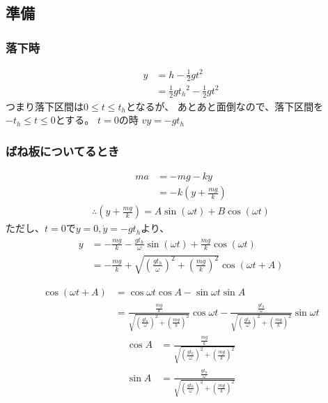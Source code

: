\documentclass[a4paper,11pt]{jsarticle}
\begin{document}
\subsection{準備}
\subsubsection{落下時}

\begin{align}
  y
   & = h - \frac{1}{2}gt^2
  \\ &= \frac{1}{2}g{t_h}^2 - \frac{1}{2}gt^2
\end{align}
つまり落下区間は$0\leq t \leq t_h$となるが、
あとあと面倒なので、落下区間を$-t_h\leq t \leq 0$とする。
$t = 0$の時
$vy = -gt_h$

\subsubsection{ばね板についてるとき}
\begin{align}
  ma & = -mg - ky
  \\ &= -k\left(y + \frac{mg}{k}\right)
\end{align}
\begin{align}
  \therefore
  \left(y+\frac{mg}{k}\right) = A\sin(\omega t) + B\cos(\omega t)
\end{align}
ただし、$t=0$で$y=0,\dot{y}=-gt_h$より、
\begin{align}
  y & = -\frac{mg}{k} - \frac{gt_h}{\omega}\sin(\omega t) + \frac{mg}{k}\cos(\omega t)
  \\ &= -\frac{mg}{k} + \sqrt{\left(\frac{gt_h}{\omega}\right)^2 + \left(\frac{mg}{k}\right)^2}\cos \left( \omega t + A \right)
\end{align}

\begin{align}
  \cos\left( \omega t + A \right)
   & = \cos \omega t \cos A - \sin \omega t \sin A
  \\&= \frac{\frac{mg}{k}}{\sqrt{\left(\frac{gt_h}{\omega}\right)^2 + \left(\frac{mg}{k}\right)^2}}\cos\omega t
  - \frac{\frac{gt_h}{\omega}}{\sqrt{\left(\frac{gt_h}{\omega}\right)^2 + \left(\frac{mg}{k}\right)^2}}\sin \omega t
\end{align}
\begin{align}
  \cos A & = \frac{\frac{mg}{k}}{\sqrt{\left(\frac{gt_h}{\omega}\right)^2 + \left(\frac{mg}{k}\right)^2}}
  \\ \sin A &= \frac{\frac{gt_h}{\omega}}{\sqrt{\left(\frac{gt_h}{\omega}\right)^2 + \left(\frac{mg}{k}\right)^2}}
\end{align}
\end{document}
